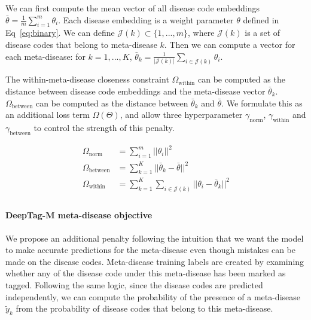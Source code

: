 \documentclass{article}[11pt,oneside]
\begin{document}
We can first compute the mean vector of all disease code embeddings $\bar \theta =  \frac{1}{m}\sum_{i=1}^m \theta_i$. Each disease embedding is a weight parameter $\theta$ defined in Eq~\ref{eq:binary}. We can define $\mathcal{J}(k) \subset \{1, ..., m\}$, where $\mathcal{J}(k)$ is a set of disease codes that belong to meta-disease $k$. Then we can compute a vector for each meta-disease: for $k=1,...,K$, $\bar \theta_k = \frac{1}{|\mathcal{J}(k)|} \sum_{i \in \mathcal{J}(k)} \theta_i$.

The within-meta-disease closeness constraint $\Omega_\text{within}$ can be computed as the distance between disease code embeddings and the meta-disease  vector $\bar \theta_k$. $\Omega_\text{between}$ can be computed as the distance between $\bar \theta_k$ and $\bar\theta$.
We formulate this as an additional loss term $\Omega(\Theta)$, and allow three hyperparameter $\gamma_{\mathrm{norm}}$, $\gamma_{\mathrm{within}}$ and $\gamma_{\mathrm{between}}$ to control the strength of this penalty.

\begin{equation}
\begin{aligned}
\Omega_{\mathrm{norm}} &= \sum_{i=1}^m ||\theta_i||^2 \\
\Omega_{\mathrm{between}} &= \sum_{k=1}^K ||\bar\theta_k - \bar\theta||^2  \\
\Omega_{\mathrm{within}} &= \sum_{k=1}^K \sum_{i \in \mathcal{J}(k)} ||\theta_i - \bar \theta_k||^2 \\
\end{aligned}
\label{eq:clustering}
\end{equation}

\paragraph{DeepTag-M meta-disease objective} 

We propose an additional penalty following the intuition that we want the model to make accurate predictions for the meta-disease even though mistakes can be made on the disease codes. Meta-disease training labels are created by examining whether any of the disease code under this meta-disease has been marked as tagged. Following the same logic,
since the disease codes are predicted independently, we can compute the probability of the presence of a meta-disease $\tilde y_k$ from the probability of disease codes that belong to this meta-disease.
\end{document}
